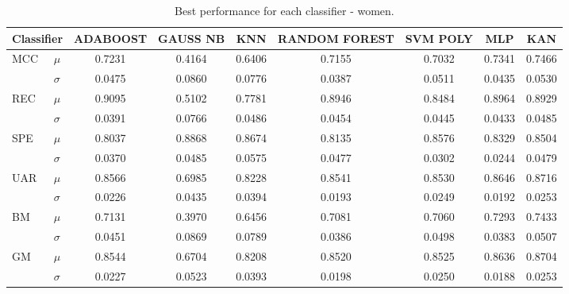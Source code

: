 \begin{table}
\centering
\caption{Best performance for each classifier - women.}
\begin{tabular}{llccccccc}
\toprule
\multicolumn{2}{l}{Classifier} & ADABOOST & GAUSS NB & KNN & RANDOM FOREST & SVM POLY & MLP & KAN \\
\midrule
\multirow{2}{*}{MCC} & $\mu$ & 0.7231 & 0.4164 & 0.6406 & 0.7155 & 0.7032 & 0.7341 & 0.7466 \\
 & $\sigma$ & 0.0475 & 0.0860 & 0.0776 & 0.0387 & 0.0511 & 0.0435 & 0.0530 \\
\midrule
\multirow{2}{*}{REC} & $\mu$ & 0.9095 & 0.5102 & 0.7781 & 0.8946 & 0.8484 & 0.8964 & 0.8929 \\
 & $\sigma$ & 0.0391 & 0.0766 & 0.0486 & 0.0454 & 0.0445 & 0.0433 & 0.0485 \\
\midrule
\multirow{2}{*}{SPE} & $\mu$ & 0.8037 & 0.8868 & 0.8674 & 0.8135 & 0.8576 & 0.8329 & 0.8504 \\
 & $\sigma$ & 0.0370 & 0.0485 & 0.0575 & 0.0477 & 0.0302 & 0.0244 & 0.0479 \\
\midrule
\multirow{2}{*}{UAR} & $\mu$ & 0.8566 & 0.6985 & 0.8228 & 0.8541 & 0.8530 & 0.8646 & 0.8716 \\
 & $\sigma$ & 0.0226 & 0.0435 & 0.0394 & 0.0193 & 0.0249 & 0.0192 & 0.0253 \\
\midrule
\multirow{2}{*}{BM} & $\mu$ & 0.7131 & 0.3970 & 0.6456 & 0.7081 & 0.7060 & 0.7293 & 0.7433 \\
 & $\sigma$ & 0.0451 & 0.0869 & 0.0789 & 0.0386 & 0.0498 & 0.0383 & 0.0507 \\
\midrule
\multirow{2}{*}{GM} & $\mu$ & 0.8544 & 0.6704 & 0.8208 & 0.8520 & 0.8525 & 0.8636 & 0.8704 \\
 & $\sigma$ & 0.0227 & 0.0523 & 0.0393 & 0.0198 & 0.0250 & 0.0188 & 0.0253 \\
\bottomrule
\end{tabular}
\label{tab:results_women}
\end{table}


